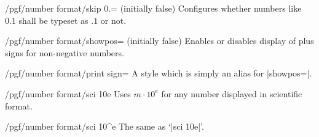 \documentclass[a4paper]{ltxdoc}
\begin{document}
\begin{key}{/pgf/number format/skip 0.= (initially false)}
    Configures whether numbers like $0.1$ shall be typeset as $.1$ or not.
\begin{codeexample}[]
\end{codeexample}

\begin{codeexample}[]
\end{codeexample}
\end{key}

\begin{key}{/pgf/number format/showpos= (initially false)}
    Enables or disables display of plus signs for non-negative numbers.
\begin{codeexample}[]
\end{codeexample}

\begin{codeexample}[]
\end{codeexample}

\begin{codeexample}[]
\end{codeexample}
\end{key}

\begin{stylekey}{/pgf/number format/print sign=}
    A style which is simply an alias for |showpos=|.
\end{stylekey}

\begin{key}{/pgf/number format/sci 10e}
    Uses $m \cdot 10^e$ for any number displayed in scientific format.

\begin{codeexample}[]
\end{codeexample}
\end{key}

\begin{key}{/pgf/number format/sci 10\textasciicircum e}
    The same as `|sci 10e|'.
\end{key}
\end{document}
